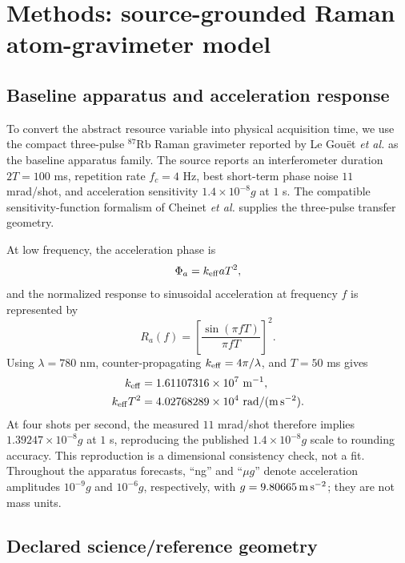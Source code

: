 \section{Methods: source-grounded Raman atom-gravimeter model}
\label{sec:apparatus}

\subsection{Baseline apparatus and acceleration response}

To convert the abstract resource variable into physical acquisition time, we use the compact three-pulse $^{87}$Rb Raman gravimeter reported by Le Gou\"et \emph{et al.} \cite{LeGouet2008} as the baseline apparatus family. The source reports an interferometer duration $2T=100$ ms, repetition rate $f_c=4$ Hz, best short-term phase noise $11$ mrad/shot, and acceleration sensitivity $1.4\times10^{-8}g$ at $1$ s. The compatible sensitivity-function formalism of Cheinet \emph{et al.} \cite{Cheinet2008} supplies the three-pulse transfer geometry.

At low frequency, the acceleration phase is
\begin{equation}
\Phi_a=k_{\rm eff}aT^2,
\label{eq:ai-scale}
\end{equation}
and the normalized response to sinusoidal acceleration at frequency $f$ is represented by
\begin{equation}
R_a(f)=\left[\frac{\sin(\pi fT)}{\pi fT}\right]^2.
\label{eq:ra}
\end{equation}
Using $\lambda=780$ nm, counter-propagating $k_{\rm eff}=4\pi/\lambda$, and $T=50$ ms gives
\begin{align}
k_{\rm eff}&=1.61107316\times10^7\ {\rm m}^{-1},\\
k_{\rm eff}T^2&=4.02768289\times10^4\ {\rm rad/(m\,s^{-2})}.
\end{align}
At four shots per second, the measured $11$ mrad/shot therefore implies $1.39247\times10^{-8}g$ at $1$ s, reproducing the published $1.4\times10^{-8}g$ scale to rounding accuracy. This reproduction is a dimensional consistency check, not a fit. Throughout the apparatus forecasts, ``ng'' and ``$\mu g$'' denote acceleration amplitudes $10^{-9}g$ and $10^{-6}g$, respectively, with $g=9.80665\,{\rm m\,s^{-2}}$; they are not mass units.

\subsection{Declared science/reference geometry}

